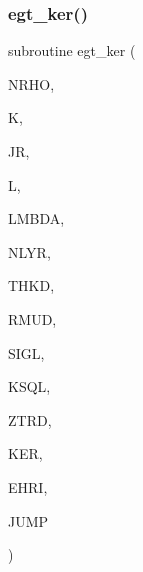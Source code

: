 \subsubsection{\texorpdfstring{egt\+\_\+ker()}{egt\_ker()}}
{\footnotesize\ttfamily subroutine egt\+\_\+ker (\begin{DoxyParamCaption}\item[{integer}]{N\+R\+HO,  }\item[{integer}]{K,  }\item[{integer}]{JR,  }\item[{integer}]{L,  }\item[{real (kind=ql)}]{L\+M\+B\+DA,  }\item[{integer}]{N\+L\+YR,  }\item[{real (kind=ql), dimension(nlyr)}]{T\+H\+KD,  }\item[{real (kind=ql), dimension(0\+:nlyr)}]{R\+M\+UD,  }\item[{complex (kind=ql), dimension(nlyr)}]{S\+I\+GL,  }\item[{complex (kind=ql), dimension(nlyr)}]{K\+S\+QL,  }\item[{real (kind=ql)}]{Z\+T\+RD,  }\item[{complex (kind=ql), dimension(jnlo-\/nrho\+:jnhi,6)}]{K\+ER,  }\item[{complex (kind=ql), dimension(nrho,6)}]{E\+H\+RI,  }\item[{logical}]{J\+U\+MP }\end{DoxyParamCaption})}

\mbox{\label{Leroi__c_8f90_a7acbe12b71ec5be34d994fc6743480c8}} 

